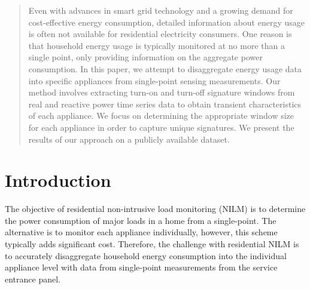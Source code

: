 \documentclass[conference]{IEEEtran}
\begin{document}
\maketitle

\begin{abstract}
Even with advances in smart grid technology and a growing demand for cost-effective  energy consumption, detailed information about energy usage is often not available for residential electricity consumers. One reason is that household energy usage is typically monitored at no more than a single point, only providing information on the aggregate power consumption.  In this paper, we attempt to disaggregate  energy usage data into specific appliances from single-point sensing measurements.  Our method involves extracting turn-on and turn-off signature windows from real and reactive power time series data to obtain transient characteristics of each appliance.  We focus on determining the appropriate window size for each appliance in order to capture unique signatures.  We present the results of our approach on a publicly available dataset.
\end{abstract}





%
\IEEEpeerreviewmaketitle



\section{Introduction}

The objective of residential non-intrusive load monitoring (NILM) is to determine the power consumption of major loads in a home from a single-point.  The alternative is to monitor each appliance individually, however, this scheme typically adds significant cost. Therefore, the challenge with residential NILM is to accurately disaggregate household energy consumption into the individual appliance level with data from single-point measurements from the service entrance panel.  
\end{document}
